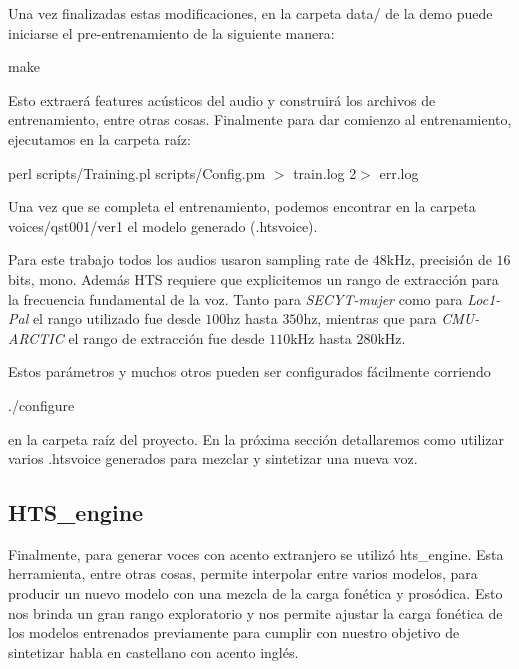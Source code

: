 Una vez finalizadas estas modificaciones, en la carpeta data/ de la demo puede iniciarse el pre-entrenamiento de la siguiente manera:

\begin{tcolorbox}
make
\end{tcolorbox}

\noindent Esto extraerá features acústicos del audio y construirá los archivos de entrenamiento, entre otras cosas. Finalmente para dar comienzo al entrenamiento, ejecutamos en la carpeta raíz:

\begin{tcolorbox}
perl scripts/Training.pl scripts/Config.pm $>$ train.log 2$>$ err.log
\end{tcolorbox}

Una vez que se completa el entrenamiento, podemos encontrar en la carpeta voices/qst001/ver1 el modelo generado (.htsvoice).

Para este trabajo todos los audios usaron sampling rate de $48$kHz, precisión de $16$bits, mono. Además HTS requiere que explicitemos un rango de extracción para la frecuencia fundamental de la voz. Tanto para \textit{SECYT-mujer} como para \textit{Loc1-Pal} el rango utilizado fue desde $100$hz hasta $350$hz, mientras que para \textit{CMU-ARCTIC} el rango de extracción fue desde $110$kHz hasta $280$kHz.

Estos parámetros y muchos otros pueden ser configurados fácilmente corriendo

\begin{tcolorbox}
./configure
\end{tcolorbox}

\noindent en la carpeta raíz del proyecto. En la próxima sección detallaremos como utilizar varios .htsvoice generados para mezclar y sintetizar una nueva voz.

\subsection{HTS\_engine} \label{interpolationTeory}

Finalmente, para generar voces con acento extranjero se utilizó hts\_engine. Esta herramienta, entre otras cosas, permite interpolar entre varios modelos, para producir un nuevo modelo con una mezcla de la carga fonética y prosódica. Esto nos brinda un gran rango exploratorio y nos permite ajustar la carga fonética de los modelos entrenados previamente para cumplir con nuestro objetivo de sintetizar habla en castellano con acento inglés.

